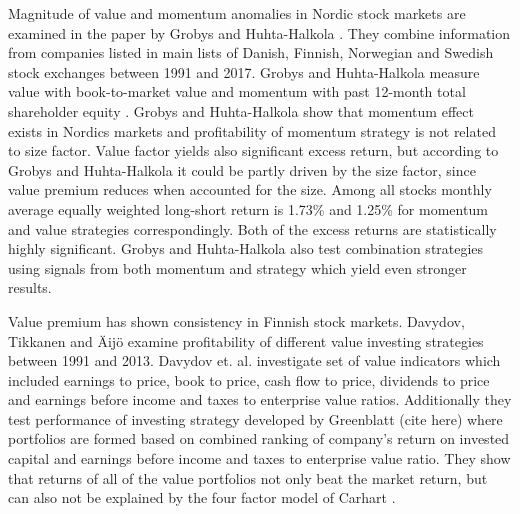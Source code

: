 \documentclass{article}
\begin{document}
Magnitude of value and momentum anomalies in Nordic stock markets are examined in the paper by Grobys and Huhta-Halkola \citeyear{grobys}. They combine information from companies listed in main lists of Danish, Finnish, Norwegian and Swedish stock exchanges between 1991 and 2017. Grobys and Huhta-Halkola measure value with book-to-market value and momentum with past 12-month total shareholder equity%
. Grobys and Huhta-Halkola show that momentum effect exists in Nordics markets and profitability of momentum strategy is not related to size factor. Value factor yields also significant excess return, but according to Grobys and Huhta-Halkola it could be partly driven by the size factor, since value premium reduces when accounted for the size. Among all stocks monthly average equally weighted long-short return is 1.73\% and 1.25\% for momentum and value strategies correspondingly. Both of the excess returns are statistically highly significant. Grobys and Huhta-Halkola also test combination strategies using signals from both momentum and strategy which yield even stronger results. \par

Value premium has shown consistency in Finnish stock markets. Davydov, Tikkanen and Äijö \citeyear{Davydov2017MagicFV} examine profitability of different value investing strategies between 1991 and 2013. Davydov et. al. investigate set of value indicators which included earnings to price, book to price, cash flow to price, dividends to price and earnings before income and taxes to enterprise value ratios. Additionally they test performance of investing strategy developed by Greenblatt (cite here) where portfolios are formed based on combined ranking of company's return on invested capital and earnings before income and taxes to enterprise value ratio. They show that returns of all of the value portfolios not only beat the market return, but can also not be explained by the four factor model of Carhart \citeyear{https://doi.org/10.1111/j.1540-6261.1997.tb03808.x}.  \par
\end{document}

